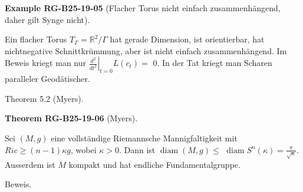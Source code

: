 \documentclass[10pt, letterpaper]{article}
\newcommand{\CustomHeading}[3]{%
  \par\medskip\noindent%
  \textbf{#1 #2} \textnormal{(#3)}.\enskip%
}
\newenvironment{THEO}[2]{\begin{unitbox}\CustomHeading{Theorem}{#1}{#2}}{\end{unitbox}}
\newenvironment{EXA}[2]{\begin{unitbox}\CustomHeading{Example}{#1}{#2}}{\end{unitbox}}
\begin{document}
\begin{EXA}{RG-B25-19-05}{Flacher Torus nicht einfach zusammenhängend, daher gilt Synge nicht}
Ein flacher Torus $T_{\Gamma}=\mathbb{R}^{2} / \Gamma$ hat gerade Dimension, ist orientierbar, hat nichtnegative Schnittkrümmung, aber ist nicht einfach zusammenhängend. Im Beweis kriegt man nur $\left.\frac{d^{2}}{d t^{2}}\right|_{t=0} L\left(c_{t}\right)=$ 0. In der Tat kriegt man Scharen paralleler Geodätischer.
\end{EXA}




Theorem 5.2 (Myers). 

\begin{THEO}{RG-B25-19-06}{Myers}
Sei $(M, g)$ eine vollständige Riemannsche Mannigfaltigkeit mit $Ric \geq(n-1) \kappa g$, wobei $\kappa>0$. Dann ist $\operatorname{diam}(M, g) \leq$ $\operatorname{diam} S^{n}(\kappa)=\frac{\pi}{\sqrt{\kappa}}$. Ausserdem ist $M$ kompakt und hat endliche Fundamentalgruppe.
\end{THEO}



Beweis. 
\end{document}
